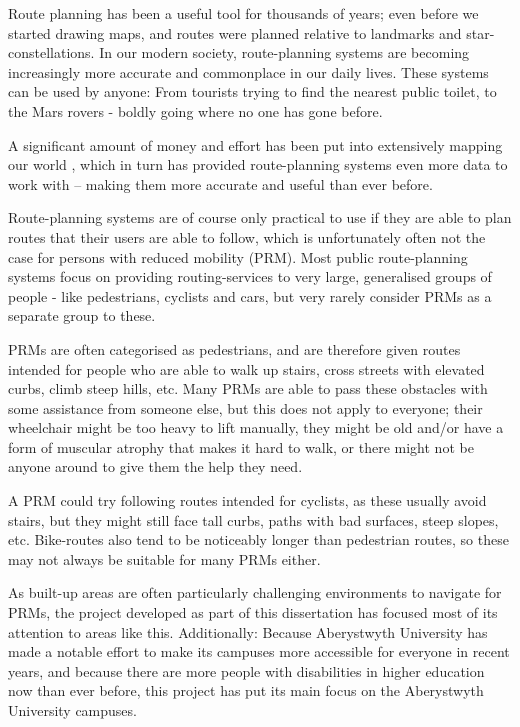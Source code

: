 Route planning has been a useful tool for thousands of years; even before we started drawing maps, and routes were planned relative to landmarks and star-constellations. In our modern society, route-planning systems are becoming increasingly more accurate and commonplace in our daily lives. These systems can be used by anyone: From tourists trying to find the nearest public toilet, to the Mars rovers\cite{marsRover} - boldly going where no one has gone before.

A significant amount of money and effort has been put into extensively mapping our world \cite{OSM,gmaps1,gmaps2,geofabrik}, which in turn has provided route-planning systems even more data to work with -- making them more accurate and useful than ever before.

Route-planning systems are of course only practical to use if they are able to plan routes that their users are able to follow, which is unfortunately often not the case for persons with reduced mobility (PRM). Most public route-planning systems focus on providing routing-services to very large, generalised groups of people - like pedestrians, cyclists and cars, but very rarely consider PRMs as a separate group to these.

PRMs are often categorised as pedestrians, and are therefore given routes intended for people who are able to walk up stairs, cross streets with elevated curbs, climb steep hills, etc. Many PRMs are able to pass these obstacles with some assistance from someone else, but this does not apply to everyone; their wheelchair might be too heavy to lift manually, they might be old and/or have a form of muscular atrophy that makes it hard to walk, or there might not be anyone around to give them the help they need.

A PRM could try following routes intended for cyclists, as these usually avoid stairs, but they might still face tall curbs, paths with bad surfaces, steep slopes, etc. Bike-routes also tend to be noticeably longer than pedestrian routes, so these may not always be suitable for many PRMs either.

As built-up areas are often particularly challenging environments to navigate for PRMs, the project developed as part of this dissertation has focused most of its attention to areas like this. Additionally: Because Aberystwyth University has made a notable effort to make its campuses more accessible for everyone in recent years, and because there are more people with disabilities in higher education now than ever before\cite{tinklin2004}, this project has put its main focus on the Aberystwyth University campuses.

